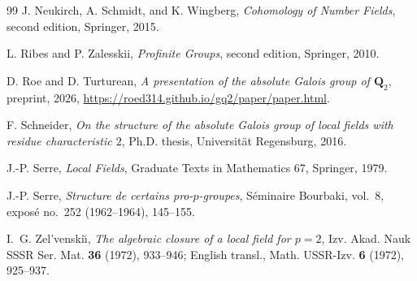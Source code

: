 \documentclass[11pt,reqno]{amsart}
\theoremstyle{definition}
\theoremstyle{remark}
\numberwithin{equation}{section}
\newcommand{\Q}{\mathbf Q}
\begin{document}
\begin{thebibliography}{99}
J. Neukirch, A. Schmidt, and K. Wingberg,
\emph{Cohomology of Number Fields}, second edition,
Springer, 2015.

L. Ribes and P. Zalesskii,
\emph{Profinite Groups}, second edition,
Springer, 2010.

D. Roe and D. Turturean,
\emph{A presentation of the absolute Galois group of \(\Q_2\)},
preprint, 2026,
\url{https://roed314.github.io/gq2/paper/paper.html}.

F. Schneider,
\emph{On the structure of the absolute Galois group of local fields
with residue characteristic \(2\)},
Ph.D. thesis, Universit\"at Regensburg, 2016.

J.-P. Serre,
\emph{Local Fields},
Graduate Texts in Mathematics 67, Springer, 1979.

J.-P. Serre,
\emph{Structure de certains pro-\(p\)-groupes},
S\'eminaire Bourbaki, vol.~8, expos\'e no.~252 (1962--1964), 145--155.

I.~G. Zel'venski\u{\i},
\emph{The algebraic closure of a local field for \(p=2\)},
Izv. Akad. Nauk SSSR Ser. Mat. \textbf{36} (1972), 933--946;
English transl., Math. USSR-Izv. \textbf{6} (1972), 925--937.

\end{thebibliography}
\end{document}
